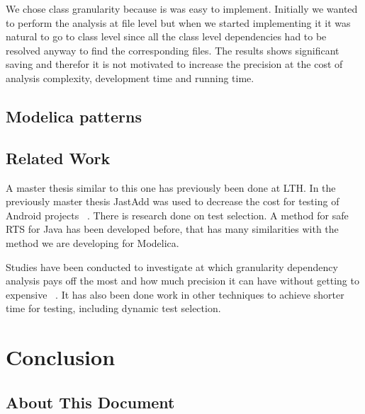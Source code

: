 \documentclass{cslthse-msc}
\begin{document}
We chose class granularity because is was easy to implement. Initially we wanted to perform the analysis at file level but when we started implementing it it was natural to go to class level since all the class level dependencies had to be resolved anyway to find the corresponding files. The results shows significant saving and therefor it is not motivated to increase the precision at the cost of analysis complexity, development time and running time.

\section{Modelica patterns}


\section{Related Work}

A master thesis similar to this one has previously been done at LTH. In the previously master thesis JastAdd was used to decrease the cost for testing of Android projects ~\cite{kampe2012dependroid}. There is research done on test selection. A method for safe RTS for Java has been developed before, that has many similarities with the method we are developing for Modelica. 

Studies have been conducted to investigate at which granularity dependency analysis pays off the most and how much precision it can have without getting to expensive ~\cite{DBLP:conf/sigsoft/LegunsenHSLZM16}. It has also been done work in other techniques to achieve shorter time for testing, including dynamic test selection.

\chapter[Conclusion]{Conclusion}

\begin{appendices}
\chapter{About This Document}
\end{appendices}
\end{document}
